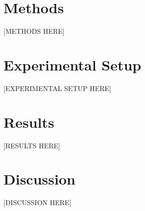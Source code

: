 \documentclass{article}
\begin{document}
\section{Methods}
[METHODS HERE]

\section{Experimental Setup}
[EXPERIMENTAL SETUP HERE]

\section{Results}
[RESULTS HERE]

\section{Discussion}
[DISCUSSION HERE]
\end{document}
